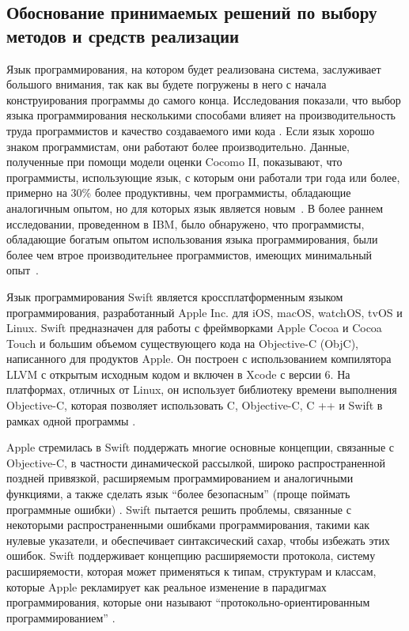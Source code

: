 \newpage
\subsection{Обоснование принимаемых решений по выбору методов и средств реализации}
\label{sec:develop:functionalModel}

Язык программирования, на котором будет реализована система, заслуживает большого внимания, так как вы будете погружены в него с начала конструирования программы до самого конца. Исследования показали, что выбор языка программирования несколькими способами влияет на производительность труда программистов и качество создаваемого ими кода \cite{code_complete}. Если язык хорошо знаком программистам, они работают более производительно. Данные, полученные при помощи модели оценки Cocomo II, показывают, что программисты, использующие язык, с которым они работали три года или более, примерно на 30\% более продуктивны, чем программисты, обладающие аналогичным опытом, но для которых язык является новым~\cite{software_cost_estimation}. В более раннем исследовании, проведенном в IBM, было обнаружено, что программисты, обладающие богатым опытом использования языка программирования, были более чем втрое производительнее программистов, имеющих минимальный опыт~\cite{method_of_programming_measurement_and_estimation}.

Язык программирования Swift является кроссплатформенным языком программирования, разработанный Apple Inc. для iOS, macOS, watchOS, tvOS и Linux. Swift предназначен для работы с фреймворками Apple Cocoa и Cocoa Touch и большим объемом существующего кода на  Objective-C (ObjC), написанного для продуктов Apple. Он построен с использованием компилятора LLVM с открытым исходным кодом и включен в Xcode с версии 6. На платформах, отличных от Linux, он использует библиотеку времени выполнения Objective-C, которая позволяет использовать C, Objective-C, C ++ и Swift в рамках одной программы \cite{objc_doc}.

Apple стремилась в Swift поддержать многие основные концепции, связанные с Objective-C, в частности динамической рассылкой, широко распространенной поздней привязкой, расширяемым программированием и аналогичными функциями, а также сделать язык \enquote{более безопасным} (проще поймать программные ошибки) \cite{mobx_best_practices}. Swift пытается решить проблемы, связанные с некоторыми распространенными ошибками программирования, такими как нулевые указатели, и обеспечивает синтаксический сахар, чтобы избежать этих ошибок. Swift поддерживает концепцию расширяемости протокола, систему расширяемости, которая может применяться к типам, структурам и классам, которые Apple рекламирует как реальное изменение в парадигмах программирования, которые они называют \enquote{протокольно-ориентированным программированием} \cite{swift_doc}.


